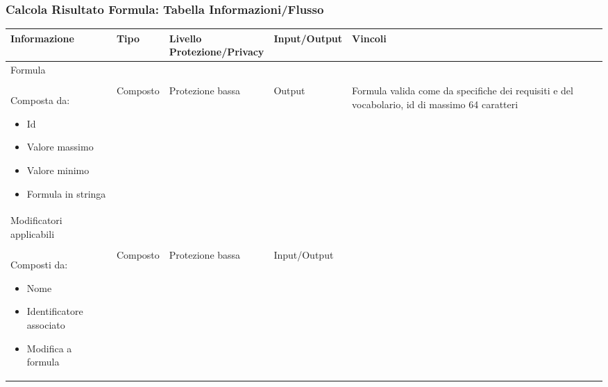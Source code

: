 \documentclass[a4paper, 11pt]{article}
\let\newline\\
\begin{document}
\subsubsection*{Calcola Risultato Formula: Tabella Informazioni/Flusso}
\begin{adjustwidth}{-1.5cm}{-1.5cm}
\begin{center}
    \begin{tabular}{|p{3cm}|p{1.5cm}|p{3.5cm}|p{2.5cm}|p{4cm}|}
        \hline
        \textbf{Informazione} & \textbf{Tipo} & \textbf{Livello \newline Protezione/Privacy} & \textbf{Input/Output}&\textbf{Vincoli}\\
        \hline
        Formula \newline \newline Composta da: 
        \begin{itemize}
            \item Id
            \item Valore massimo
            \item Valore minimo
            \item Formula in stringa
        \end{itemize}& Composto & Protezione bassa & Output & Formula valida come da specifiche dei requisiti e del vocabolario, id di massimo 64 caratteri \\\hline
        Modificatori applicabili \newline \newline Composti da: 
        \begin{itemize}
            \item Nome
            \item Identificatore associato 
            \item Modifica a formula
        \end{itemize} & Composto & Protezione bassa & Input/Output & \\
        \hline
    \end{tabular}
\end{center}
\end{adjustwidth}

\vspace{2em}
\end{document}
